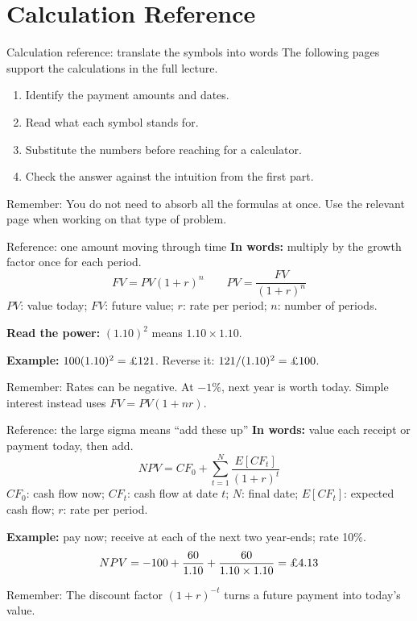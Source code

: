 \documentclass[10pt,aspectratio=169]{beamer}
\newcommand{\remember}[1]{\par\smallskip\alert{Remember:} #1}
\renewcommand{\pounds}{\ifmmode\text{\textsterling}\else\textsterling\fi}
\begin{document}
\section{Calculation Reference}
\begin{frame}{Calculation reference: translate the symbols into words}
The following pages support the calculations in the full lecture.
\par\smallskip
\begin{enumerate}
\item Identify the payment amounts and dates.
\item Read what each symbol stands for.
\item Substitute the numbers before reaching for a calculator.
\item Check the answer against the intuition from the first part.
\end{enumerate}
\remember{You do not need to absorb all the formulas at once. Use the relevant page when working on that type of problem.}
\end{frame}

\begin{frame}[label=single]{Reference: one amount moving through time}
\textbf{In words:} multiply by the growth factor once for each period.
\[
FV=PV(1+r)^n\qquad PV=\frac{FV}{(1+r)^n}
\]
$PV$: value today; $FV$: future value; $r$: rate per period; $n$: number of periods.
\par\smallskip
\textbf{Read the power:} $(1.10)^2$ means $1.10\times1.10$.
\par\smallskip
\textbf{Example:} $100(1.10)^2=\pounds121$. Reverse it: $121/(1.10)^2=\pounds100$.
\remember{Rates can be negative. At $-1\%$, \pounds99 next year is worth \pounds100 today. Simple interest instead uses $FV=PV(1+nr)$.}
\end{frame}

\begin{frame}[label=sum]{Reference: the large sigma means ``add these up''}
\textbf{In words:} value each receipt or payment today, then add.
\[
NPV=CF_0+\sum_{t=1}^{N}\frac{E[CF_t]}{(1+r)^t}
\]
$CF_0$: cash flow now; $CF_t$: cash flow at date $t$; $N$: final date; $E[CF_t]$: expected cash flow; $r$: rate per period.
\par\smallskip
\textbf{Example:} pay \pounds100 now; receive \pounds60 at each of the next two year-ends; rate 10\%.
\[
NPV=-100+\frac{60}{1.10}+\frac{60}{1.10\times1.10}=\pounds4.13
\]
\remember{The discount factor $(1+r)^{-t}$ turns a future payment into today's value.}
\end{frame}
\end{document}
